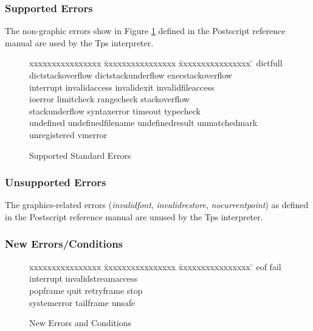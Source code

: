\subsubsection{Supported Errors}
The non-graphic errors show in Figure \ref{stderrors} 
defined in the Postscript reference manual are used by
the Tps interpreter.
\begin{figure}[b]\centering
\horizontalline
\begin{tabbing}
xxxxxxxxxxxxxxxx \= xxxxxxxxxxxxxxxx \= xxxxxxxxxxxxxxxx \= \kill
dictfull \> dictstackoverflow \> dictstackunderflow \> execstackoverflow \\
interrupt \> invalidaccess \> invalidexit \> invalidfileaccess \\
ioerror \> limitcheck \> rangecheck \> stackoverflow \\
stackunderflow \> syntaxerror \> timeout \> typecheck \\
undefined \> undefinedfilename \> undefinedresult \> unmatchedmark \\
unregistered \> vmerror
\end{tabbing}
\caption{Supported Standard Errors}
\label{stderrors}
\end{figure}

\subsubsection{Unsupported Errors}
The graphics-related errors
({\em invalidfont}, {\em invalidrestore}, {\em nocurrentpoint})
as defined in the Postscript reference manual are unused by the Tps
interpreter.

\subsubsection{New Errors/Conditions}
\begin{figure}[b]\centering
\begin{tabbing}
xxxxxxxxxxxxxxxx \= xxxxxxxxxxxxxxxx \= xxxxxxxxxxxxxxxx \= \kill
eof \> fail \> interrupt \> invalidstreamaccess \\
popframe \> quit \> retryframe \> stop \\
systemerror \> tailframe \> unsafe
\end{tabbing}
\caption{New Errors and Conditions}
\label{newerrors}
\end{figure}

